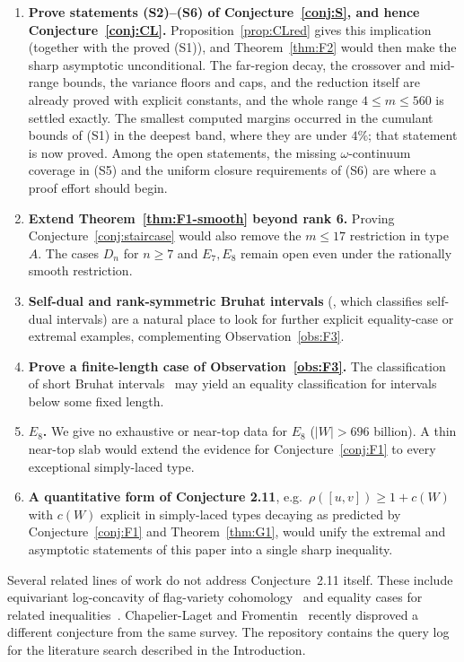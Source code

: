 \documentclass[11pt]{amsart}
\theoremstyle{plain}
\theoremstyle{definition}
\theoremstyle{remark}
\newcommand{\W}{W}
\begin{document}
\begin{enumerate}
\item \textbf{Prove statements (S2)--(S6) of
Conjecture~\ref{conj:S}, and hence Conjecture~\ref{conj:CL}.}
Proposition~\ref{prop:CLred} gives this implication (together with the
proved (S1)), and Theorem~\ref{thm:F2} would then make the sharp
asymptotic unconditional. The far-region decay, the crossover and mid-range bounds, the variance floors and caps, and the reduction itself are already proved with explicit constants, and the whole range $4\le m\le560$ is settled exactly. The smallest
computed margins occurred in the cumulant bounds of (S1) in the deepest
band, where they are under $4\%$; that statement is now proved. Among the
open statements, the missing $\omega$-continuum coverage in (S5) and the
uniform closure requirements of (S6) are where a proof effort should
begin.
\item \textbf{Extend Theorem~\ref{thm:F1-smooth} beyond rank 6.}
Proving Conjecture~\ref{conj:staircase} would also remove the $m\le17$
restriction in type $A$. The cases $D_n$ for $n\ge7$ and $E_7,E_8$ remain
open even under the rationally smooth restriction.
\item \textbf{Self-dual and rank-symmetric Bruhat intervals}
(\cite{gaetzgao2020}, which classifies self-dual intervals) are a natural
place to look for further explicit equality-case or extremal examples,
complementing Observation~\ref{obs:F3}.
\item \textbf{Prove a finite-length case of
Observation~\ref{obs:F3}.} The classification of short Bruhat
intervals~\cite{short-intervals} may yield an equality classification for
intervals below some fixed length.
\item \textbf{$E_8$.} We give no exhaustive or near-top data for $E_8$
($|W|>696$ billion). A thin near-top slab would extend the evidence for
Conjecture~\ref{conj:F1} to every exceptional simply-laced type.
\item \textbf{A quantitative form of Conjecture 2.11}, e.g.\ $\rho([u,v])
\ge 1+c(\W)$ with $c(\W)$ explicit in simply-laced types decaying as
predicted by Conjecture~\ref{conj:F1} and Theorem~\ref{thm:G1}, would unify
the extremal and asymptotic statements of this paper into a single sharp
inequality.
\end{enumerate}

Several related lines of work do not address Conjecture~2.11 itself. These
include equivariant log-concavity of flag-variety
cohomology~\cite{equivariant-logconcave} and equality cases for related
inequalities~\cite{stanley-yan,kahn-saks}. Chapelier-Laget and
Fromentin~\cite{chapelier-fromentin} recently disproved a different
conjecture from the same survey. The repository contains the query log for
the literature search described in the Introduction.
\end{document}
